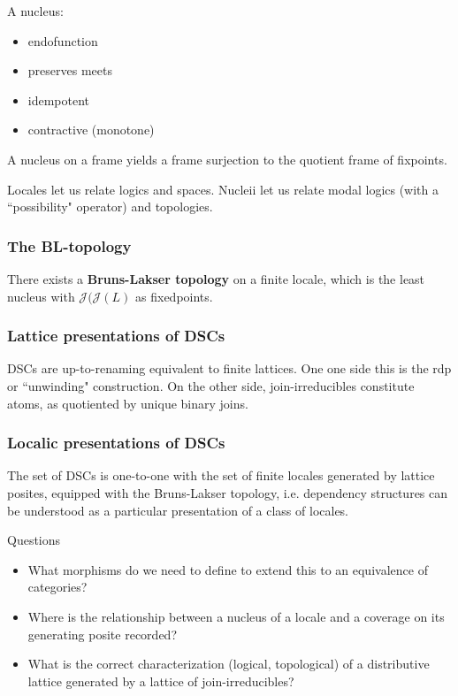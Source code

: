 \documentclass{beamer}
\newcommand{\Jc}{\mathcal{J}}
\begin{document}
\begin{frame}
A nucleus:
\begin{itemize}
\item endofunction
\item preserves meets
\item idempotent
\item contractive (monotone)
\end{itemize}

A nucleus on a frame yields a frame surjection to the quotient frame of fixpoints.
\end{frame}

\begin{frame}
Locales let us relate logics and spaces. Nucleii let us relate modal logics (with a ``possibility" operator) and topologies.
\end{frame}

\begin{frame}
\frametitle{The BL-topology}
\begin{lemma}
There exists a \textbf{Bruns-Lakser topology} on a finite locale, which is the least nucleus with \(\Jc(\Jc(L)\) as fixedpoints.
\end{lemma}

\end{frame}


\begin{frame}
\frametitle{Lattice presentations of DSCs}
\begin{lemma}
DSCs are up-to-renaming equivalent to finite lattices. One one side this is the rdp or ``unwinding" construction. On the other side, join-irreducibles constitute atoms, as quotiented by unique binary joins.
\end{lemma}
\end{frame}

\begin{frame}
\frametitle{Localic presentations of DSCs}

\begin{theorem}
The set of DSCs is one-to-one with the set of finite locales generated by lattice posites, equipped with the Bruns-Lakser topology, i.e. dependency structures can be understood as a particular presentation of a class of locales.
\end{theorem}

Questions
\begin{itemize}
\item What morphisms do we need to define to extend this to an equivalence of categories?
\item Where is the relationship between a nucleus of a locale and a coverage on its generating posite recorded?
\item What is the correct characterization (logical, topological) of a distributive lattice generated by a lattice of join-irreducibles?
\end{itemize}

\end{frame}
\end{document}
